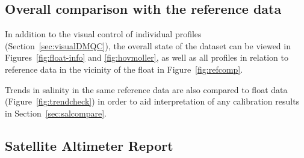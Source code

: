 \documentclass{article}
\begin{document}
\newpage
\subsection{Overall comparison with the reference data}\label{sec:overall}
In addition to the visual control of individual profiles
(Section~\ref{sec:visualDMQC}), the overall state of the dataset can be
viewed in Figures~\ref{fig:float-info} and \ref{fig:hovmoller}, as well as
all profiles in relation to reference data in the vicinity of the float in
Figure~\ref{fig:refcomp}.

Trends in salinity in the same reference data are also compared to float
data (Figure~\ref{fig:trendcheck}) in order to aid interpretation of any
calibration results in Section~\ref{sec:salcompare}.

\begin{figure}[H] 
\end{figure}
%
\begin{figure}[H] 
\end{figure}

 

\newpage
\subsection{Satellite Altimeter Report}

      
\newpage
\end{document}
